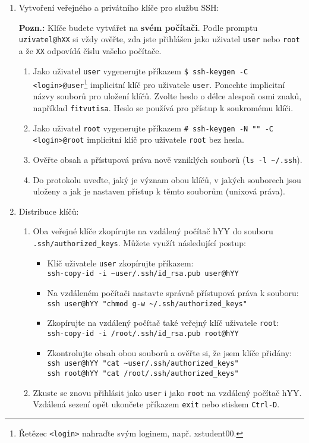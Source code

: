 \documentclass[a4paper,11pt]{article}
\begin{document}
\begin{enumerate}
  \item Vytvoření veřejného a privátního klíče pro službu SSH:

  \textbf{Pozn.:} Klíče budete vytvářet na \textbf{svém počítači}. Podle promptu \verb|uzivatel@hXX| si vždy ověřte, zda jste přihlášen jako
  uživatel {\tt user} nebo {\tt root} a že \verb|XX| odpovídá číslu vašeho počítače.
    \begin{enumerate}
      \item Jako uživatel {\tt user} vygenerujte příkazem \verb|$ ssh-keygen -C <login>@user|\footnote{Řetězec {\tt <login>} nahraďte svým loginem, např. xstudent00.} implicitní klíč pro uživatele {\tt user}. Ponechte implicitní názvy souborů pro uložení klíčů. Zvolte heslo o délce alespoň osmi znaků, například \texttt{fitvutisa}. Heslo se používá pro přístup k soukromému klíči.
      \item Jako uživatel {\tt root} vygenerujte příkazem \verb|# ssh-keygen -N "" -C <login>@root|
        implicitní klíč pro uživatele {\tt root} bez hesla.
      \item Ověřte obsah a přístupová práva nově vzniklých souborů (\verb|ls -l ~/.ssh|).
      \item Do protokolu uveďte, jaký je význam obou klíčů, v jakých souborech jsou uloženy a jak je nastaven přístup k těmto souborům (unixová práva).
    \end{enumerate}

  \item Distribuce klíčů:
    \begin{enumerate}
      \item Oba veřejné klíče zkopírujte na vzdálený počítač hYY do souboru \verb|.ssh/authorized_keys|. Můžete využít následující postup:
        \begin{itemize}
          \item Klíč uživatele {\tt user} zkopírujte příkazem: \\
            {\verb&ssh-copy-id -i ~user/.ssh/id_rsa.pub user@hYY&}
          \item Na vzdáleném počítači nastavte správně přístupová práva k souboru:\\
            {\verb&ssh user@hYY "chmod g-w ~/.ssh/authorized_keys"&} 
          \item Zkopírujte na vzdálený počítač také veřejný klíč uživatele {\tt root}: \\
            {\verb&ssh-copy-id -i /root/.ssh/id_rsa.pub root@hYY&}
          \item Zkontrolujte obsah obou souborů a ověřte si, že jsem klíče přidány: \\
            {\verb&ssh user@hYY "cat ~user/.ssh/authorized_keys"&} \\
            {\verb&ssh root@hYY "cat /root/.ssh/authorized_keys"&}
        \end{itemize}
      \item Zkuste se znovu přihlásit jako \texttt{user} i jako \texttt{root} na vzdálený počítač hYY.
      Vzdálená sezení opět ukončete příkazem {\tt exit} nebo stiskem {\tt Ctrl-D}.


\end{enumerate}
\end{enumerate}
\end{document}
